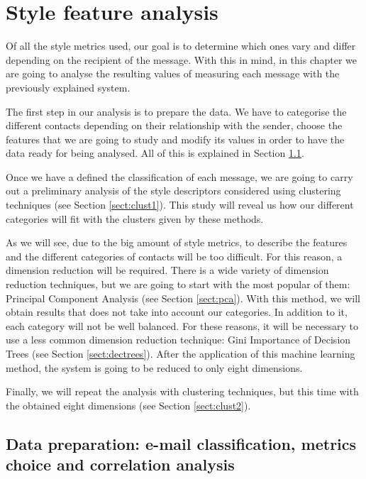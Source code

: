 \chapter{Style feature analysis}


Of all the style metrics used, our goal is to determine which ones vary and differ depending on the recipient of the message. With this in mind, in this chapter we are going to analyse the resulting values of measuring each message with the previously explained system.

The first step in our analysis is to prepare the data. We have to categorise the different contacts depending on their relationship with the sender, choose the features that we are going to study and modify its values in order to have the data ready for being analysed. All of this is explained in Section \ref{sect:DatPrep}.

Once we have a defined the classification of each message, we are going to carry out a preliminary analysis of the style descriptors considered using clustering techniques (see Section \ref{sect:clust1}). This study will reveal us how our different categories will fit with the clusters given by these methods.

As we will see, due to the big amount of style metrics, to describe the features and the different categories of contacts will be too difficult. For this reason, a dimension reduction will be required. There is a wide variety of dimension reduction techniques, but we are going to start with the most popular of them: Principal Component Analysis (see Section \ref{sect:pca}). With this method, we will obtain results that does not take into account our categories. In addition to it, each category will not be well balanced. For these reasons, it will be necessary to use a less common dimension reduction technique: Gini Importance of Decision Trees (see Section \ref{sect:dectrees}). After the application of this machine learning method, the system is going to be reduced to only eight dimensions.

Finally, we will repeat the analysis with clustering techniques, but this time with the obtained eight dimensions (see Section \ref{sect:clust2}).

\section{Data preparation: e-mail classification, metrics choice and correlation analysis}\label{sect:DatPrep}


